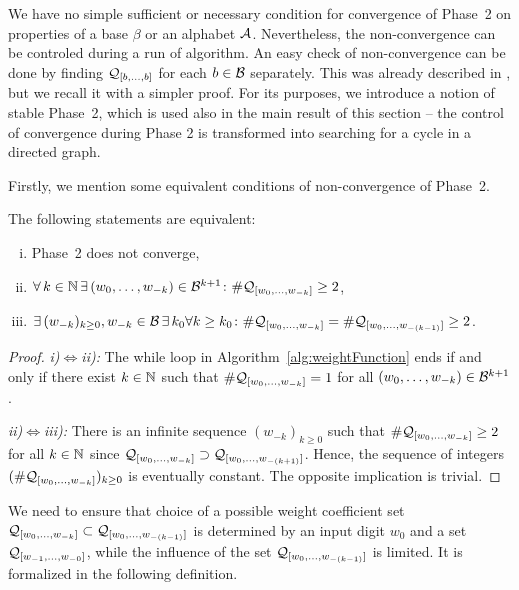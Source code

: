 \label{sec:convergencePhase2}

We have no simple sufficient or necessary condition for convergence of Phase~2 on properties of a base $\beta$ or an alphabet $\mathcal{A}$. Nevertheless, the non-convergence can be controled during a run of algorithm. An easy check of non-convergence can be done by finding $\mathcal{Q}_{[b, \dots, b]}$ for each $b\in\mathcal{B}$ separately. This was already described in \cite{vu}, but we recall it with a simpler proof. For its purposes, we introduce a notion of stable Phase~2, which is used also in the main result of this section -- the control of convergence during Phase 2 is transformed into searching for a cycle in a directed graph.

Firstly, we mention some equivalent conditions of non-convergence of Phase~2. 
\begin{lem}
\label{lem:equivalentStatementsForNonConvergenePhaseTwo}
The following statements are equivalent:
\begin{enumerate}[i)]
	\item Phase~2 does not converge,
	\item $\forall \,k\in \mathbb{N} \,\exists\, (w_{0}, \dots, w_{-k})\in\mathcal{B}^{k+1} \colon \#\mathcal{Q}_{[w_{0}, \dots, w_{-k}]}\geq 2$,
	\item $\exists \,(w_{-k})_{k\geq 0}, w_{-k}\in\mathcal{B} \,\exists\, k_0\forall k\geq k_0 \colon \#\mathcal{Q}_{[w_{0}, \dots, w_{-k}]}=\#\mathcal{Q}_{[w_{0}, \dots, w_{-(k-1)}]}\geq 2$.
\end{enumerate}
\end{lem}
\begin{proof}
\textit{i)}$\iff$\textit{ii):} The while loop in Algorithm~\ref{alg:weightFunction} ends if and only if there exist $k\in\mathbb{N}$ such that $\#\mathcal{Q}_{[w_{0}, \dots, w_{-k}]}=1$ for all $(w_{0}, \dots, w_{-k})\in\mathcal{B}^{k+1}$.

\textit{ii)}$\iff$\textit{iii):} There is an infinite sequence $(w_{-k})_{k\geq 0}$ such that $\#\mathcal{Q}_{[w_{0}, \dots, w_{-k}]}\geq 2$ for all $k\in\mathbb{N}$ since $\mathcal{Q}_{[w_{0}, \dots, w_{-k}]}\supset\mathcal{Q}_{[w_{0}, \dots, w_{-(k+1)}]}$. Hence, the sequence of integers $(\#\mathcal{Q}_{[w_{0}, \dots, w_{-k}]})_{k\geq 0}$ is eventually constant. The opposite implication is trivial.
\end{proof}

We need to ensure that choice of a possible weight coefficient set $\mathcal{Q}_{[w_{0}, \dots, w_{-k}]}\subset \mathcal{Q}_{[w_{0}, \dots, w_{-(k-1)}]}$ is determined by an input digit $w_0$ and a set $\mathcal{Q}_{[w_{-1}, \dots, w_{-0}]}$, while the influence of the set $\mathcal{Q}_{[w_{0}, \dots, w_{-(k-1)}]}$ is limited. It is formalized in the following definition.

